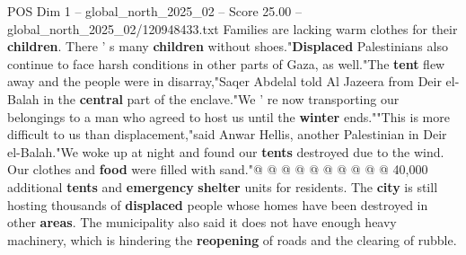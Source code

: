 \begin{textsample}{POS Dim 1 – global\_north\_2025\_02 – Score 25.00 – global\_north\_2025\_02/120948433.txt}
Families are lacking warm clothes for their \textbf{children}.
There ' s many \textbf{children} without shoes."\textbf{Displaced} Palestinians also continue to face harsh conditions in other parts of Gaza, as well."The \textbf{tent} flew away and the people were in disarray,"Saqer Abdelal told Al Jazeera from Deir el-Balah in the \textbf{central} part of the enclave."We ' re now transporting our belongings to a man who agreed to host us until the \textbf{winter} ends.""This is more difficult to us than displacement,"said Anwar Hellis, another Palestinian in Deir el-Balah."We woke up at night and found our \textbf{tents} destroyed due to the wind.
Our clothes and \textbf{food} were filled with sand."@ @ @ @ @ @ @ @ @ @ 40,000 additional \textbf{tents} and \textbf{emergency} \textbf{shelter} units for residents.
The \textbf{city} is still hosting thousands of \textbf{displaced} people whose homes have been destroyed in other \textbf{areas}.
The municipality also said it does not have enough heavy machinery, which is hindering the \textbf{reopening} of roads and the clearing of rubble.

\end{textsample}
